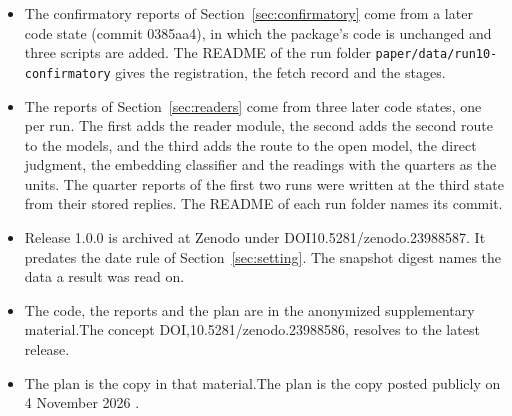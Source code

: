 \begin{itemize}
\item The confirmatory reports of Section~\ref{sec:confirmatory} come from a later code state\iftmlr\else{} (commit 0385aa4)\fi, in which the package's code is unchanged and three scripts are added. The README of the run folder \texttt{paper/data/run10-confirmatory} gives the registration, the fetch record and the stages.
\item The reports of Section~\ref{sec:readers} come from three later code states, one per run. The first adds the reader module, the second adds the second route to the models, and the third adds the route to the open model, the direct judgment, the embedding classifier and the readings with the quarters as the units. The quarter reports of the first two runs were written at the third state from their stored replies. The README of each run folder names its commit.
\item \iftmlr\else Release 1.0.0 is archived at Zenodo under DOI\newline \mbox{10.5281/zenodo.23988587}. It predates the date rule of Section~\ref{sec:setting}. \fi The snapshot digest names the data a result was read on.
\item \iftmlr The code, the reports and the plan are in the anonymized supplementary material.\else The concept DOI,\newline \mbox{10.5281/zenodo.23988586}, resolves to the latest release.\fi
\item \iftmlr The plan is the copy in that material.\else The plan is the copy posted publicly on 4 November 2026 \cite{mootcourt2026plan}.\fi
\end{itemize}
